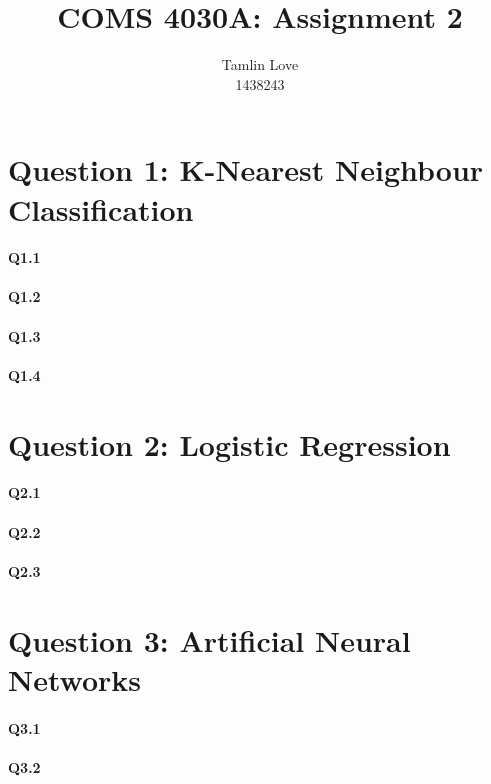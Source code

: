 \documentclass [11pt]{article}
\title{COMS 4030A: Assignment 2}
\author{Tamlin Love\\1438243}
\date{}
\begin{document}
\maketitle
\section*{Question 1: K-Nearest Neighbour Classification}
\paragraph*{Q1.1}
\paragraph*{Q1.2}
\paragraph*{Q1.3}
\paragraph*{Q1.4}
\section*{Question 2: Logistic Regression}
\paragraph*{Q2.1}
\paragraph*{Q2.2}
\paragraph*{Q2.3}
\section*{Question 3: Artificial Neural Networks}
\paragraph*{Q3.1}
\paragraph*{Q3.2}
\end{document}

